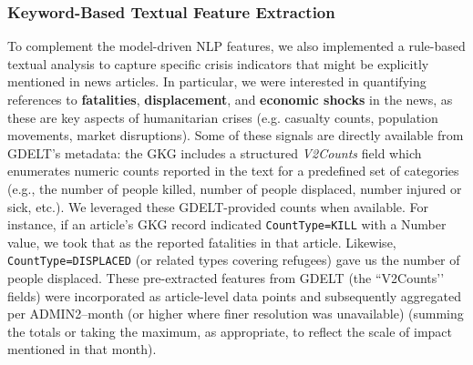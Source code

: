 \documentclass{article}
\begin{document}
\subsubsection{Keyword-Based Textual Feature Extraction}
To complement the model-driven NLP features, we also implemented a rule-based textual analysis to capture specific crisis indicators that might be explicitly mentioned in news articles. In particular, we were interested in quantifying references to \textbf{fatalities}, \textbf{displacement}, and \textbf{economic shocks} in the news, as these are key aspects of humanitarian crises (e.g. casualty counts, population movements, market disruptions). Some of these signals are directly available from GDELT’s metadata: the GKG includes a structured \textit{V2Counts} field which enumerates numeric counts reported in the text for a predefined set of categories (e.g., the number of people killed, number of people displaced, number injured or sick, etc.). We leveraged these GDELT-provided counts when available. For instance, if an article’s GKG record indicated \texttt{CountType=KILL} with a Number value, we took that as the reported fatalities in that article. Likewise, \texttt{CountType=DISPLACED} (or related types covering refugees) gave us the number of people displaced. These pre-extracted features from GDELT (the ``V2Counts’’ fields) were incorporated as article-level data points and subsequently aggregated per ADMIN2–month (or higher where finer resolution was unavailable) (summing the totals or taking the maximum, as appropriate, to reflect the scale of impact mentioned in that month).\\
\end{document}
